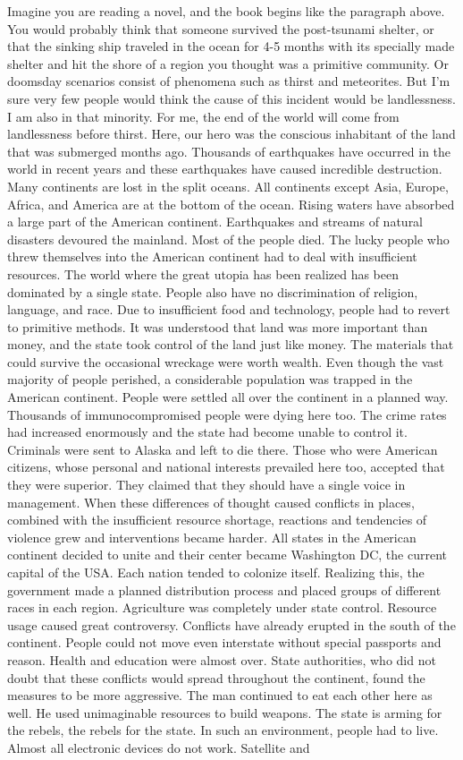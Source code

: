 \documentclass[]{book}
\begin{document}
Imagine you are reading a novel, and the book begins like the paragraph above. You would probably think that someone survived the post-tsunami shelter, or that the sinking ship traveled in the ocean for 4-5 months with its specially made shelter and hit the shore of a region you thought was a primitive community. Or doomsday scenarios consist of phenomena such as thirst and meteorites. But I'm sure very few people would think the cause of this incident would be landlessness. I am also in that minority. For me, the end of the world will come from landlessness before thirst. Here, our hero was the conscious inhabitant of the land that was submerged months ago. Thousands of earthquakes have occurred in the world in recent years and these earthquakes have caused incredible destruction. Many continents are lost in the split oceans. All continents except Asia, Europe, Africa, and America are at the bottom of the ocean. Rising waters have absorbed a large part of the American continent. Earthquakes and streams of natural disasters devoured the mainland. Most of the people died. The lucky people who threw themselves into the American continent had to deal with insufficient resources. The world where the great utopia has been realized has been dominated by a single state. People also have no discrimination of religion, language, and race. Due to insufficient food and technology, people had to revert to primitive methods. It was understood that land was more important than money, and the state took control of the land just like money. The materials that could survive the occasional wreckage were worth wealth. Even though the vast majority of people perished, a considerable population was trapped in the American continent. People were settled all over the continent in a planned way. Thousands of immunocompromised people were dying here too. The crime rates had increased enormously and the state had become unable to control it. Criminals were sent to Alaska and left to die there. Those who were American citizens, whose personal and national interests prevailed here too, accepted that they were superior. They claimed that they should have a single voice in management. When these differences of thought caused conflicts in places, combined with the insufficient resource shortage, reactions and tendencies of violence grew and interventions became harder. All states in the American continent decided to unite and their center became Washington DC, the current capital of the USA. Each nation tended to colonize itself. Realizing this, the government made a planned distribution process and placed groups of different races in each region. Agriculture was completely under state control. Resource usage caused great controversy. Conflicts have already erupted in the south of the continent. People could not move even interstate without special passports and reason. Health and education were almost over. State authorities, who did not doubt that these conflicts would spread throughout the continent, found the measures to be more aggressive. The man continued to eat each other here as well. He used unimaginable resources to build weapons. The state is arming for the rebels, the rebels for the state. In such an environment, people had to live. Almost all electronic devices do not work. Satellite and 
\end{document}
